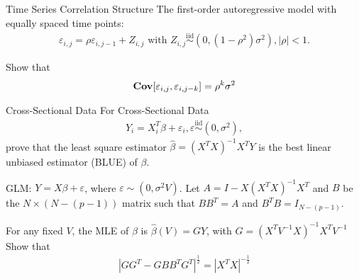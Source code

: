 \documentclass[UTF8,a4paper,10pt]{article}
\begin{document}
  \begin{Problem}[]{Time Series Correlation Structure}
The first-order autoregressive model with equally spaced time points:
\begin{equation*}
  \begin{aligned}
    \varepsilon_{i,j} = \rho\varepsilon_{i,j-1}+Z_{i,j}\text{ with }Z_{i,j}\overset{\text{iid}}{\sim } (0,(1-\rho^2)\sigma^2),|\rho|<1.
  \end{aligned}
\end{equation*}

Show that 
\begin{equation*}
  \begin{aligned}
    \operatorname{\textbf{Cov}}[\varepsilon_{i,j},\varepsilon_{i,j-k}] = \rho^k\sigma^2
  \end{aligned}
\end{equation*}

  \end{Problem} 



  \begin{Problem}[]{Cross-Sectional Data}
    For Cross-Sectional Data
    \begin{equation*}
      \begin{aligned}
        Y_i = X_i^T\beta +\varepsilon_i, \varepsilon \overset{\text{iid}}{\sim } (0,\sigma^2),
      \end{aligned}
    \end{equation*}
    prove that the least square estimator \(\hat{\beta} = (X^TX)^{-1}X^TY\) is the best linear unbiased estimator (BLUE) of \(\beta\).
    
      \end{Problem} 
    
  \begin{Problem}[]{}

    GLM: \(Y = X\beta +\varepsilon \), where \(\varepsilon \sim(0,\sigma^2V)\).
    Let \(A = I-X(X^TX)^{-1}X^T\) and \(B\) be the \(N\times (N-(p-1))\) matrix such that \(BB^T = A\) and \(B^TB = I_{N-(p-1)}\).

    For any fixed \(V\), the MLE of \(\beta\) is \(\hat{\beta}(V) = GY\), with \(G = (X^TV^{-1}X)^{-1}X^TV^{-1}\)
    Show that
    \begin{equation*}
      \begin{aligned}
        |GG^T-GBB^TG^T|^{\frac{1}{2}} = |X^TX|^{-\frac{1}{2}}
      \end{aligned}
    \end{equation*}
    
      \end{Problem} 
\end{document}
